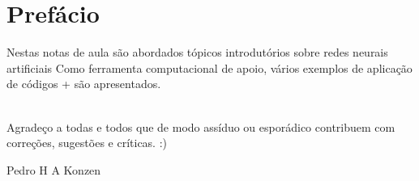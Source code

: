 
\chapter*{Prefácio}\label{prefacio}

Nestas notas de aula são abordados tópicos introdutórios sobre redes neurais artificiais Como ferramenta computacional de apoio, vários exemplos de aplicação de códigos {\python}+{\pytorch} são apresentados.

~\\

Agradeço a todas e todos que de modo assíduo ou esporádico contribuem com correções, sugestões e críticas. :)

\begin{flushright}
  Pedro H A Konzen
\end{flushright}


